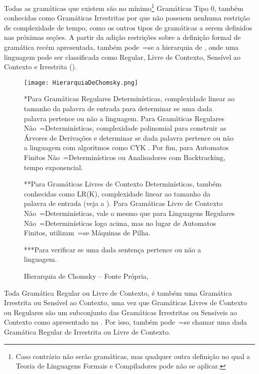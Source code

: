 Todas as gramáticas que existem são no mínimo\footnote{
Caso contrário não serão gramáticas,
mas qualquer outra definição no qual a Teoria de Linguagens Formais e
Compiladores pode não se aplicar.
}
Gramáticas Tipo 0,
também conhecidas como Gramáticas Irrestritas por que não possuem nenhuma restrição de complexidade de tempo,
como os outros tipos de gramáticas a serem definidos nas próximas seções{}.
A partir da adição restrições sobre a definição formal de gramática recém apresentada,
também pode~=se  a hierarquia de ,
onde uma linguagem pode ser classificada como Regular,
Livre de Contexto,
Sensível ao Contexto e
Irrestrita ().
\begin{figure}[h]
\centering
\texttt{[image: HierarquiaDeChomsky.png]}
\begin{minipage}{\textwidth} \footnotesize
*Para Gramáticas Regulares Determinísticas,
complexidade linear ao tamanho da palavra de entrada para determinar se uma dada palavra pertence ou
não a linguagem.
Para Gramáticas Regulares Não~=Determinísticas,
complexidade polinomial para construir as Árvores de Derivações e
determinar se dada palavra pertence ou
não a linguagem com algoritmos como CYK \cite{hopcroftBook,cykParsingAlgorithm}.
Por fim,
para Automatos Finitos Não~=Determinísticos ou
Analisadores com Backtracking,
tempo exponencial.

**Para Gramáticas Livres de Contexto Determinísticas,
também conhecidas como LR(K),
complexidade linear ao tamanho da palavra de entrada (veja a ).
Para Gramáticas Livre de Contexto Não~=Determinísticas,
vale o mesmo que para Linguagens Regulares Não~=Determinísticas logo acima,
mas no lugar de Automatos Finitos,
utilizam~=se Máquinas de Pilha.

***Para verificar se uma dada sentença pertence ou não a linguagem.
\end{minipage}
\caption[Hierarquia de Chomsky]{Hierarquia de Chomsky -- Fonte Própria\protect\footnotemark,
}
\label{HierarquiaDeChomsky}
\end{figure}

Toda Gramática Regular ou
Livre de Contexto,
é também uma Gramática Irrestrita ou
Sensível ao Contexto,
uma vez que Gramáticas Livres de Contexto ou
Regulares são um subconjunto das Gramáticas Irrestritas ou
Sensíveis ao Contexto como apresentado na .
Por isso,
também pode~=se chamar uma dada Gramática Regular de Irrestrita ou
Livre de Contexto.

